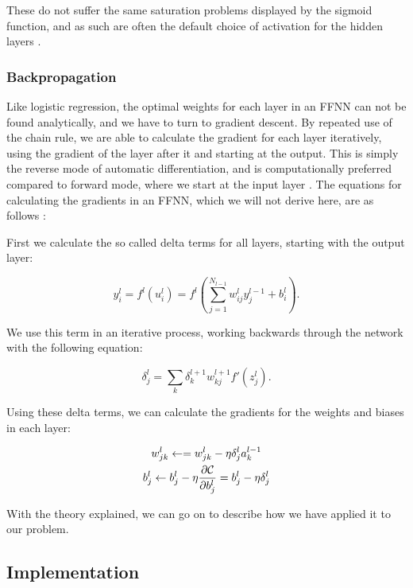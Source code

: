 \documentclass[onecolumn,10pt,cleanfoot]{asme2ej}
\begin{document}
These do not suffer the same saturation problems displayed by the sigmoid function, and as such are often the default choice of activation for the hidden layers \cite[188]{gbc}.

\subsubsection{Backpropagation}

Like logistic regression, the optimal weights for each layer in an FFNN can not be found analytically, and we have to turn to gradient descent. By repeated use of the chain rule, we are able to calculate the gradient for each layer iteratively, using the gradient of the layer after it and starting at the output. This is simply the reverse mode of automatic differentiation, and is computationally preferred compared to forward mode, where we start at the input layer \cite[416]{sr}. The equations for calculating the gradients in an FFNN, which we will not derive here, are as follows \cite{morten}:

First we calculate the so called delta terms for all layers, starting with the output layer:

\begin{equation}
y_i^l = f^l(u_i^l) = f^l\left(\sum_{j=1}^{N_{l-1}} w_{ij}^l y_j^{l-1} + b_i^l\right).
\end{equation}

We use this term in an iterative process, working backwards through the network with the following equation:

\begin{equation}
\delta_j^l = \sum_k \delta_k^{l+1}w_{kj}^{l+1}f'(z_j^l).
\end{equation}

Using these delta terms, we can calculate the gradients for the weights and biases in each layer:

\begin{gather}
w_{jk}^l\leftarrow  = w_{jk}^l- \eta \delta_j^la_k^{l-1} \\
b_j^l \leftarrow b_j^l-\eta \frac{\partial {\cal C}}{\partial b_j^l}=b_j^l-\eta \delta_j^l
\end{gather}

With the theory explained, we can go on to describe how we have applied it to our problem.

\subsection{Implementation}
\end{document}
